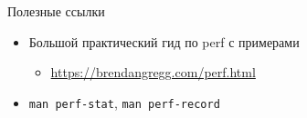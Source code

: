 \documentclass[aspectratio=169, russian]{beamer}
\begin{document}
\begin{frame}{Полезные ссылки}
    \begin{itemize}
        \item Большой практический гид по perf с примерами
              \begin{itemize}
                  \item \url{https://brendangregg.com/perf.html}
              \end{itemize}

        \item \texttt{man perf-stat}, \texttt{man perf-record}
    \end{itemize}
\end{frame}
\end{document}
